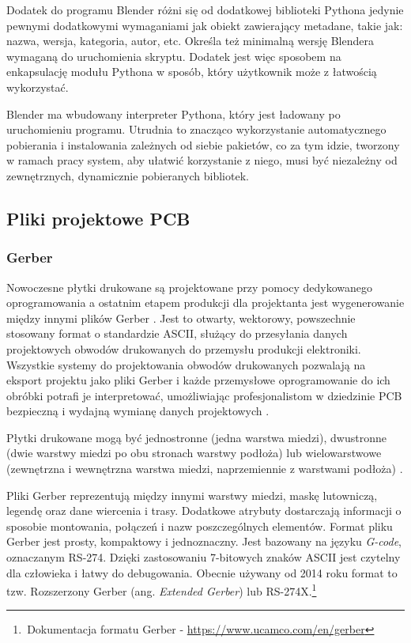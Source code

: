 \documentclass{xmgr}
\begin{document}
Dodatek do programu Blender różni się od dodatkowej biblioteki Pythona jedynie pewnymi dodatkowymi wymaganiami jak obiekt zawierający metadane, takie jak: nazwa, wersja, kategoria, autor, etc. Określa też minimalną wersję Blendera wymaganą do uruchomienia skryptu. Dodatek jest więc sposobem na enkapsulację modułu Pythona w sposób, który użytkownik może z łatwością wykorzystać.

Blender ma wbudowany interpreter Pythona, który jest ładowany po uruchomieniu programu. Utrudnia to znacząco wykorzystanie automatycznego pobierania i instalowania zależnych od siebie pakietów, co za tym idzie, tworzony w ramach pracy system, aby ułatwić korzystanie z niego, musi być niezależny od zewnętrznych, dynamicznie pobieranych bibliotek.


\subsection{Pliki projektowe PCB}

\subsubsection {Gerber}
Nowoczesne płytki drukowane są projektowane przy pomocy dedykowanego oprogramowania a ostatnim etapem produkcji dla projektanta jest wygenerowanie między innymi plików Gerber \cite{Khandpur}.
Jest to otwarty, wektorowy, powszechnie stosowany format o standardzie ASCII, służący do przesyłania danych projektowych obwodów drukowanych do przemysłu produkcji elektroniki. Wszystkie systemy do projektowania obwodów drukowanych pozwalają na eksport projektu jako pliki Gerber i każde przemysłowe oprogramowanie do ich obróbki potrafi je interpretować, umożliwiając profesjonalistom w dziedzinie PCB bezpieczną i wydajną wymianę danych projektowych \cite{Williams}.

Płytki drukowane mogą być jednostronne (jedna warstwa miedzi), dwustronne (dwie warstwy miedzi po obu stronach warstwy podłoża) lub wielowarstwowe (zewnętrzna i wewnętrzna warstwa miedzi, naprzemiennie z warstwami podłoża) \cite{schroeder}.

Pliki Gerber reprezentują między innymi warstwy miedzi, maskę lutowniczą, legendę oraz dane wiercenia i trasy. Dodatkowe atrybuty dostarczają informacji o sposobie montowania, połączeń i nazw poszczególnych elementów. Format pliku Gerber jest prosty, kompaktowy i jednoznaczny. Jest bazowany na języku \emph{G-code}, oznaczanym RS-274. Dzięki zastosowaniu 7-bitowych znaków ASCII jest czytelny dla człowieka i łatwy do debugowania. Obecnie używany od 2014 roku format to tzw. Rozszerzony Gerber (ang. \emph{Extended Gerber}) lub RS-274X.\footnote{\,Dokumentacja formatu Gerber - \url{https://www.ucamco.com/en/gerber}}
\end{document}
